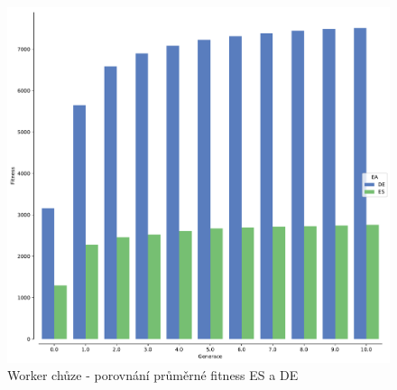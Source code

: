 		\begin{figure}[t]\centering
		\includegraphics[width=\columnwidth]{../img/WoodMap/DEvsES/WorkerWalkMem}
		\caption{Worker chůze - porovnání průměrné fitness ES a DE}
		\label{obr04:WWalkESvsDE}
	\end{figure}
